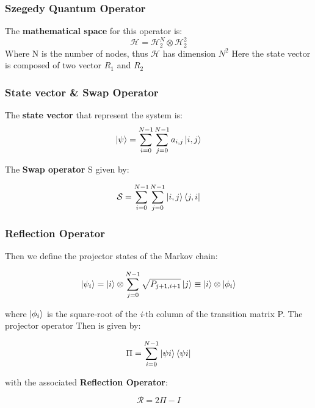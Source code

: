 \documentclass{beamer}
\begin{document}
\begin{frame}
    \frametitle{Szegedy Quantum Operator}
    
    The \textbf{mathematical space} for this operator is:
    \begin{equation}
        \mathcal{H} = \mathcal{H}_{2}^{N} \otimes \mathcal{H}_{2}^{2}
    \end{equation}
    Where N is the number of nodes, thus $\mathcal{H}$ has dimension $N^{2}$ 
    Here the state vector is composed of two vector $R_{1}$ and $R_{2}$

\end{frame}

\begin{frame}
    \frametitle{State vector \& Swap Operator}
    The \textbf{state vector} that represent the system is:
    \begin{equation}
        \ket{\psi} = \sum_{i=0}^{N-1}\sum_{j=0}^{N-1} a_{i,j}\ket{i,j} 
    \end{equation}
    
    The \textbf{Swap operator} S given by:
    
    \begin{equation}
        \mathcal{S} = \sum_{i=0}^{N-1}\sum_{j=0}^{N-1} \ket{i,j}\bra{j,i} 
    \end{equation}
    
\end{frame}

\begin{frame}
    \frametitle{Reflection Operator}
    Then we define the projector states of the Markov chain:
    
    \begin{equation}
        \ket{\psi_{i}} = \ket{i} \otimes \sum_{j=0}^{N-1}\sqrt{P_{j+1,i+1}}\ket{j} \equiv \ket{i} \otimes \ket{\phi_{i}}
    \end{equation}
    
    where $\ket{\phi_{i}}$ is the square-root of the \textit{i}-th column of the transition matrix P. The projector operator Then is given by:
    
    \begin{equation}
        \Pi = \sum_{i=0}^{N-1}\ket{\psi{i}}\bra{\psi{i}}
    \end{equation}
    
    with the associated \textbf{Reflection Operator}:
    
    \begin{equation}
        \mathcal{R} = 2\Pi - I
    \end{equation}
    
\end{frame}
\end{document}
